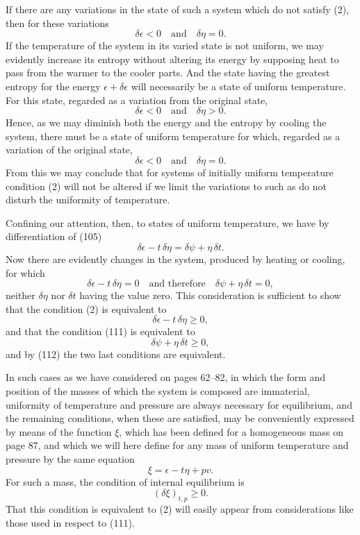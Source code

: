 \documentclass[11pt]{article}
\newcommand{\eps}{\epsilon}
\begin{document}
If there are any variations in the state of such a system which do not satisfy (2), then for these variations
\[
\delta\eps<0\quad\text{and}\quad \delta\eta=0.
\]
If the temperature of the system in its varied state is not uniform, we may evidently increase its entropy without altering its energy by supposing heat to pass from the warmer to the cooler parts. And the state having the greatest entropy for the energy \(\eps+\delta\eps\) will necessarily be a state of uniform temperature. For this state, regarded as a variation from the original state,
\[
\delta\eps<0\quad\text{and}\quad \delta\eta>0.
\]
Hence, as we may diminish both the energy and the entropy by cooling the system, there must be a state of uniform temperature for which, regarded as a variation of the original state,
\[
\delta\eps<0\quad\text{and}\quad \delta\eta=0.
\]
From this we may conclude that for systems of initially uniform temperature condition (2) will not be altered if we limit the variations to such as do not disturb the uniformity of temperature.

Confining our attention, then, to states of uniform temperature, we have by differentiation of (105)
\begin{equation}
\delta\eps-t\,\delta\eta=\delta\psi+\eta\,\delta t.
\end{equation}
Now there are evidently changes in the system, produced by heating or cooling, for which
\begin{equation}
\delta\eps-t\,\delta\eta=0\quad\text{and therefore}\quad \delta\psi+\eta\,\delta t=0,
\end{equation}
neither \(\delta\eta\) nor \(\delta t\) having the value zero. This consideration is sufficient to show that the condition (2) is equivalent to
\begin{equation}
\delta\eps-t\,\delta\eta\geq 0,
\end{equation}
and that the condition (111) is equivalent to
\begin{equation}
\delta\psi+\eta\,\delta t\geq 0,
\end{equation}
and by (112) the two last conditions are equivalent.

In such cases as we have considered on pages 62--82, in which the form and position of the masses of which the system is composed are immaterial, uniformity of temperature and pressure are always necessary for equilibrium, and the remaining conditions, when these are satisfied, may be conveniently expressed by means of the function \(\xi\), which has been defined for a homogeneous mass on page 87, and which we will here define for any mass of uniform temperature and pressure by the same equation
\begin{equation}
\xi=\eps-t\eta+pv.
\end{equation}
For such a mass, the condition of internal equilibrium is
\begin{equation}
(\delta\xi)_{t,p}\geq 0.
\end{equation}
That this condition is equivalent to (2) will easily appear from considerations like those used in respect to (111).
\end{document}
